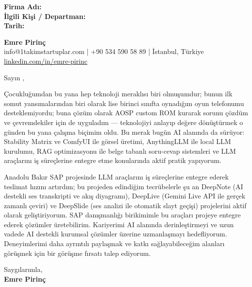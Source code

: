 \documentclass[a4paper,10pt]{extarticle}
\newcommand{\blank}[1]{\uline{\hspace{#1}}}
\begin{document}
\textbf{Firma Adı:} \blank{6cm}\\
\textbf{İlgili Kişi / Departman:} \blank{5cm}\\
\textbf{Tarih:} \blank{4cm}

\vspace{16pt}

{\large\bfseries Emre Pirinç}\\
{\small info@1takimstartuplar.com | +90 534 590 58 89 | İstanbul, Türkiye}\\
{\small \href{https://linkedin.com/in/emre-pirinc}{linkedin.com/in/emre-pirinc}}

\vspace{12pt}

\vspace{8pt}

Sayın \blank{6cm},

Çocukluğumdan bu yana hep teknoloji meraklısı biri olmuşumdur; bunun ilk somut yansımalarından biri olarak lise birinci sınıfta oynadığım oyun telefonumu desteklemiyordu; buna çözüm olarak AOSP custom ROM kurarak sorunu çözdüm ve çevremdekiler için de uyguladım — teknolojiyi anlayıp değere dönüştürmek o günden bu yana çalışma biçimim oldu. Bu merak bugün AI alanında da sürüyor: Stability Matrix ve ComfyUI ile görsel üretimi, AnythingLLM ile local LLM kurulumu, RAG optimizasyonu ile belge tabanlı soru-cevap sistemleri ve LLM araçlarını iş süreçlerine entegre etme konularında aktif pratik yapıyorum.

Anadolu Bakır SAP projesinde LLM araçlarını iş süreçlerine entegre ederek teslimat hızını artırdım; bu projeden edindiğim tecrübelerle şu an DeepNote (AI destekli ses transkripti ve akış diyagramı), DeepLive (Gemini Live API ile gerçek zamanlı çeviri) ve DeepSlide (ses analizi ile otomatik slayt geçişi) projelerini aktif olarak geliştiriyorum. SAP danışmanlığı birikimimle bu araçları projeye entegre ederek çözümler üretebilirim. Kariyerimi AI alanında derinleştirmeyi ve uzun vadede AI destekli kurumsal çözümler üzerine uzmanlaşmayı hedefliyorum. Deneyimlerimi daha ayrıntılı paylaşmak ve katkı sağlayabileceğim alanları görüşmek için bir görüşme fırsatı talep ediyorum.

\vspace{16pt}

Saygılarımla,\\[4pt]
{\bfseries Emre Pirinç}
\end{document}
